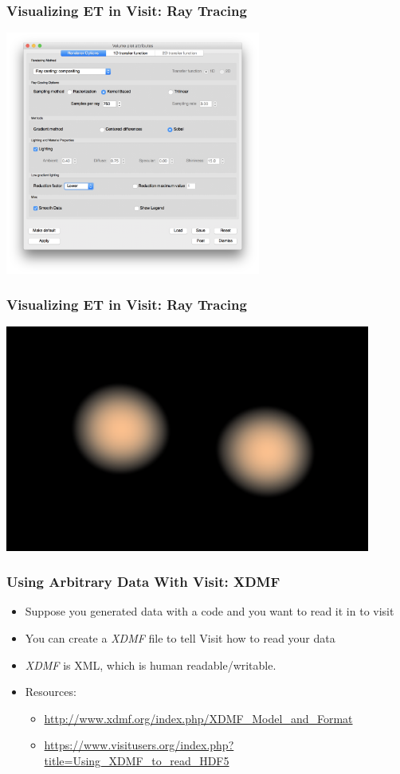 \documentclass[]{beamer}
\begin{document}
\begin{frame}
  \frametitle{Visualizing ET in Visit: Ray Tracing}
  \begin{center}
    \includegraphics[height=8cm]{figures/visit/ray-trace-choice}
  \end{center}
\end{frame}

\begin{frame}
  \frametitle{Visualizing ET in Visit: Ray Tracing}
  \begin{center}
    \includegraphics[width=12cm]{figures/visit/stars-volume-render}
  \end{center}
\end{frame}

\begin{frame}
  \frametitle{Using Arbitrary Data With Visit: XDMF}
      \begin{itemize}
      \item Suppose you generated data with a code and you want to read it in to visit
      \item You can create a \textit{XDMF} file to tell Visit how to read your data
      \item \textit{XDMF} is XML, which is human readable/writable.
      \item Resources:
        \begin{itemize}
        \item \url{http://www.xdmf.org/index.php/XDMF_Model_and_Format}
        \item \url{https://www.visitusers.org/index.php?title=Using_XDMF_to_read_HDF5}
        \end{itemize}
      \end{itemize}
\end{frame}
\end{document}
